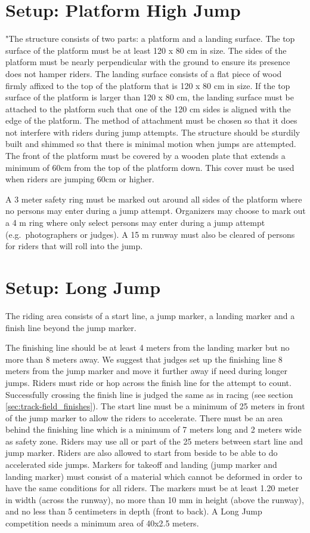 \section{Setup: Platform High Jump}
"The structure consists of two parts: a platform and a landing surface.
The top surface of the platform must be at least 120 x 80 cm in size.
The sides of the platform must be nearly perpendicular with the ground to ensure its presence does not hamper riders.
The landing surface consists of a flat piece of wood firmly affixed to the top of the platform that is 120 x 80 cm in size.
If the top surface of the platform is larger than 120 x 80 cm, the landing surface must be attached to the platform such that one of the 120 cm sides is aligned with the edge of the platform.
The method of attachment must be chosen so that it does not interfere with riders during jump attempts.
The structure should be sturdily built and shimmed so that there is minimal motion when jumps are attempted.
The front of the platform must be covered by a wooden plate that extends a minimum of 60cm from the top of the platform down.
This cover must be used when riders are jumping 60cm or higher.

A 3 meter safety ring must be marked out around all sides of the platform where no persons may enter during a jump attempt.
Organizers may choose to mark out a 4 m ring where only select persons may enter during a jump attempt (e.g.\ photographers or judges).
A 15 m runway must also be cleared of persons for riders that will roll into the jump.

\section{Setup: Long Jump}
The riding area consists of a start line, a jump marker, a landing marker and a finish line beyond the jump marker.

The finishing line should be at least 4 meters from the landing marker but no more than 8 meters away.
We suggest that judges set up the finishing line 8 meters from the jump marker and move it further away if need during longer jumps.
Riders must ride or hop across the finish line for the attempt to count.
Successfully crossing the finish line is judged the same as in racing (see section \ref{sec:track-field_finishes}).
The start line must be a minimum of 25 meters in front of the jump marker to allow the riders to accelerate.
There must be an area behind the finishing line which is a minimum of 7 meters long and 2 meters wide as safety zone.
Riders may use all or part of the 25 meters between start line and jump marker.
Riders are also allowed to start from beside to be able to do accelerated side jumps.
Markers for takeoff and landing (jump marker and landing marker) must consist of a material which cannot be deformed in order to have the same conditions for all riders.
The markers must be at least 1.20 meter in width (across the runway), no more than 10 mm in height (above the runway), and no less than 5 centimeters in depth (front to back).
A Long Jump competition needs a minimum area of 40x2.5 meters.

